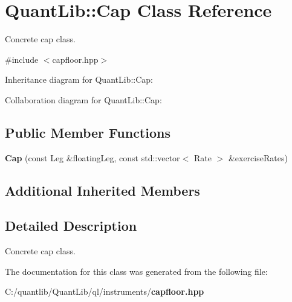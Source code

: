 \section{Quant\+Lib\+:\+:Cap Class Reference}
\label{class_quant_lib_1_1_cap}


Concrete cap class.  




{\ttfamily \#include $<$capfloor.\+hpp$>$}



Inheritance diagram for Quant\+Lib\+:\+:Cap\+:


Collaboration diagram for Quant\+Lib\+:\+:Cap\+:
\subsection*{Public Member Functions}
\begin{DoxyCompactItemize}
\item 
{\bfseries Cap} (const Leg \&floating\+Leg, const std\+::vector$<$ Rate $>$ \&exercise\+Rates)\label{class_quant_lib_1_1_cap_a408db5a6290b3e0b95d10ee01cccff4d}

\end{DoxyCompactItemize}
\subsection*{Additional Inherited Members}


\subsection{Detailed Description}
Concrete cap class. 



The documentation for this class was generated from the following file\+:\begin{DoxyCompactItemize}
\item 
C\+:/quantlib/\+Quant\+Lib/ql/instruments/{\bf capfloor.\+hpp}\end{DoxyCompactItemize}
